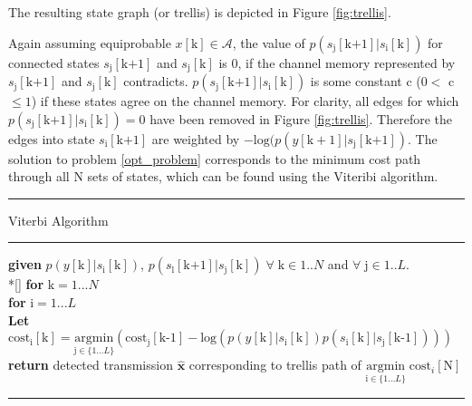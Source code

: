 The resulting state graph (or trellis) is depicted in Figure \ref{fig:trellis}. 

Again assuming equiprobable 
$x[\text{k}] \in \mathcal{A}$, the value of $p(s_{\text{j}}[\text{k+1}]|s_{\text{i}}[\text{k}])$ for connected states $s_{\text{j}}[\text{k+1}]$ and $s_{\text{j}}[\text{k}]$ is  0, if the channel memory represented by $s_{\text{j}}[\text{k+1}]$ and $s_{\text{j}}[\text{k}]$ contradicts. $p(s_{\text{j}}[\text{k+1}]|s_{\text{i}}[\text{k}])$  is some constant c ($0<$ c $\leq1$) if these states agree on the channel memory. For clarity, all edges for which $p(s_{\text{j}}[\text{k+1}]|s_{\text{i}}[\text{k}])=0$ have been removed in Figure \ref{fig:trellis}. Therefore the edges into state $s_{\text{i}}[\text{k+1}]$ are weighted by
$-\text{log}(p(y[\text{k}+1]|s_{\text{j}}[\text{k+1}])$. The solution to problem \ref{opt_problem} corresponds to the minimum cost path through all N sets of states, which can be found using the Viteribi algorithm. 
\\

    \noindent\rule[16pt]{\textwidth}{0.6pt}
	Viterbi Algorithm

    \noindent\rule[10pt]{\textwidth}{0.4pt}
    {\footnotesize
    \begin{tabbing}
        {\textbf{ given}} $p(y[\text{k}]|s_{\text{i}}[\text{k}])$, $p(s_{\text{l}}[\text{k+1}]|s_{\text{j}}[\text{k}]) \; \forall  \; \text{k} \in {1..N}$ and $ \forall \; \text{j} \in {1..L}$. \\*[\smallskipamount]
        {\textbf{for}  $\text{k} = 1... N $} \\
         \qquad \= {\textbf{for} $\text{i} = 1... L$}\\
        \qquad \qquad \= \textbf{Let} $\text{cost}_{\text{i}}[\text{k}] = \underset{\text{j} \in \{1...L\}} {\text{argmin}}\left( \text{cost}_{\text{j}}[\text{k-1}]
        -\text{log}(p(y[\text{k}]|s_{\text{i}}[\text{k}])p(s_{\text{i}}[\text{k}]|s_{\text{j}}[\text{k-1}]))
        \right)$ \\
        {\textbf{ return}} detected transmission $\hat{\mathbf{x}}$ corresponding to trellis path of $\underset{\text{i} \in \{1...L\}} {\text{argmin}} \; \text{cost}_{i}[\text{N}] $
    \end{tabbing}}
    \noindent\rule[10pt]{\textwidth}{0.4pt}





